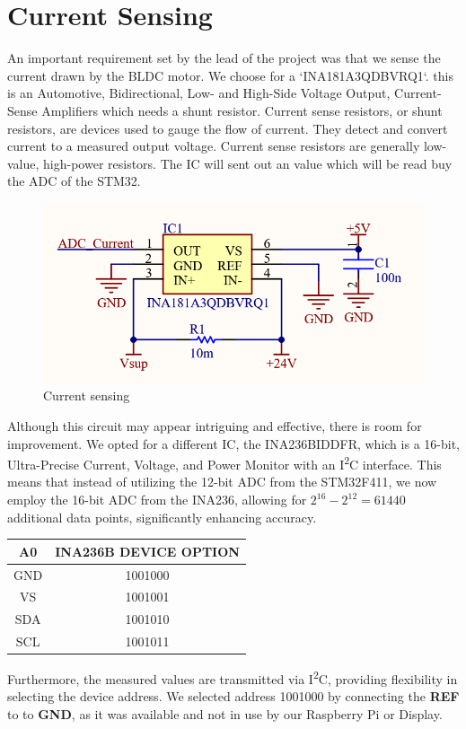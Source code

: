 \section{Current Sensing}
An important requirement set by the lead of the project was that we sense the current drawn by the BLDC motor. We choose for a `INA181A3QDBVRQ1`. this is an Automotive, Bidirectional, Low- and High-Side Voltage Output,
Current-Sense Amplifiers which needs a shunt resistor. Current sense resistors, or shunt resistors, are devices used to gauge the flow of current. They detect and convert current to a measured output voltage. Current sense resistors are generally low-value, high-power resistors. The IC will sent out an value which will be read buy the ADC of the STM32. 
\begin{figure}[H]
    \centering
    \includegraphics[width=0.5\linewidth]{img/Currentsense schem.png}
    \caption{Current sensing}
    \label{fig:Current sense Schem}
\end{figure}

Although this circuit may appear intriguing and effective, there is room for improvement. We opted for a different IC, the INA236BIDDFR, which is a 16-bit, Ultra-Precise Current, Voltage, and Power Monitor with an I\textsuperscript{2}C interface. This means that instead of utilizing the 12-bit ADC from the STM32F411, we now employ the 16-bit ADC from the INA236, allowing for \(2^{16}-2^{12}=61440\) additional data points, significantly enhancing accuracy. 
\begin{table}[H]
\begin{tabular}{|c|c|}
\hline
\rowcolor[HTML]{C0C0C0} 
\textbf{A0} & \textbf{INA236B DEVICE OPTION} \\ \hline
GND         & 1001000                        \\ \hline
VS          & 1001001                        \\ \hline
SDA         & 1001010                        \\ \hline
SCL         & 1001011                        \\ \hline
\end{tabular}
\end{table}
Furthermore, the measured values are transmitted via I\textsuperscript{2}C, providing flexibility in selecting the device address. We selected address 1001000 by connecting the \textbf{REF} to to \textbf{GND}, as it was available and not in use by our Raspberry Pi or Display.

